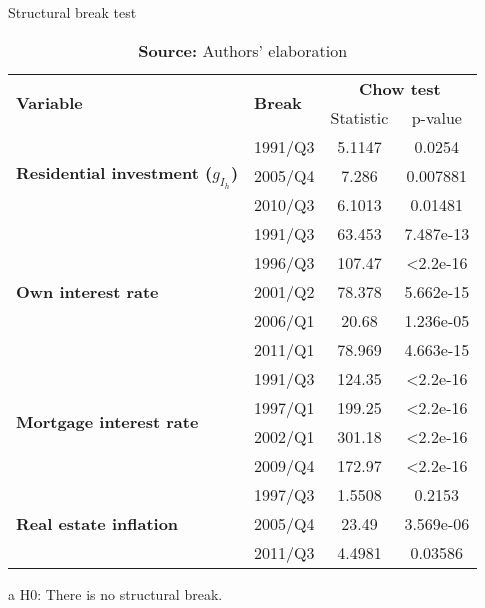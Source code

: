 \begin{table}[H]
	\centering
	\caption{Structural break test}
	\label{structbreak}
	\begin{threeparttable}
		\begin{tabular}{l|l|cc}
			\hline \hline
			\multirow{2}{*}{\textbf{Variable}} & \multirow{2}{*}{\textbf{Break}} & \multicolumn{2}{c}{\textbf{Chow test}\tnote{a}} \\ \cline{3-4} 
			&& Statistic & p-value \\ \hline
			\multirow{3}{*}{\textbf{Residential investment ($g_{I_h}$)}} & 1991/Q3 & 5.1147 & 0.0254 \\
			& 2005/Q4 & 7.286 & 0.007881 \\
			& 2010/Q3 & 6.1013 & 0.01481 \\ \hline
			\multirow{5}{*}{\textbf{Own interest rate}} & 1991/Q3 & 63.453 & 7.487e-13 \\
			& 1996/Q3 & 107.47 & \textless 2.2e-16 \\
			& 2001/Q2 & 78.378 & 5.662e-15 \\
			& 2006/Q1 & 20.68 & 1.236e-05 \\
			& 2011/Q1 & 78.969 & 4.663e-15 \\ \hline
			\multirow{4}{*}{\textbf{Mortgage interest rate}} & 1991/Q3 & 124.35 & \textless 2.2e-16 \\
			& 1997/Q1 & 199.25 & \textless 2.2e-16 \\
			& 2002/Q1 & 301.18 & \textless 2.2e-16 \\
			& 2009/Q4 & 172.97 & \textless 2.2e-16 \\ \hline
			\multirow{3}{*}{\textbf{Real estate inflation}} & 1997/Q3 & 1.5508 & 0.2153 \\
			& 2005/Q4 & 23.49 & 3.569e-06 \\
			& 2011/Q3 & 4.4981 & 0.03586 \\ 
			\hline \hline
		\end{tabular}%
	\begin{tablenotes}\footnotesize
		\item [a] H0: There is no structural break.
	\end{tablenotes}
\end{threeparttable}
	\caption*{\textbf{Source:} Authors' elaboration}
\end{table}
